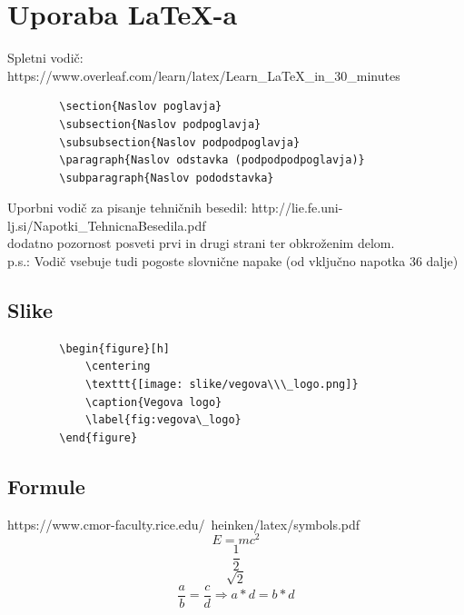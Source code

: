 \documentclass[12pt]{article}
\begin{document}
\newpage
\section{Uporaba \LaTeX-a}
    Spletni vodič: https://www.overleaf.com/learn/latex/Learn\_LaTeX\_in\_30\_minutes
    \begin{verbatim}
        \section{Naslov poglavja}
        \subsection{Naslov podpoglavja}
        \subsubsection{Naslov podpodpoglavja}
        \paragraph{Naslov odstavka (podpodpodpoglavja)}
        \subparagraph{Naslov pododstavka}
    \end{verbatim}

    Uporbni vodič za pisanje tehničnih besedil: http://lie.fe.uni-lj.si/Napotki\_TehnicnaBesedila.pdf \\
    dodatno pozornost posveti prvi in drugi strani ter obkroženim delom. \\
    p.s.: Vodič vsebuje tudi pogoste slovnične napake (od vključno napotka 36 dalje)
    \subsection{Slike}
    \begin{verbatim}
        \begin{figure}[h]
            \centering
            \texttt{[image: slike/vegova\\\_logo.png]}
            \caption{Vegova logo}
            \label{fig:vegova\_logo}
        \end{figure}
    \end{verbatim}

    \subsection{Formule}
    https://www.cmor-faculty.rice.edu/~heinken/latex/symbols.pdf
    \begin{equation}
        E = mc^2
    \end{equation}
    $$\frac{1}{2}$$
    $$\sqrt{2}$$
    \begin{equation}
        \frac{a}{b} = \frac{c}{d} \Rightarrow a*d = b*d
    \end{equation}
\end{document}
